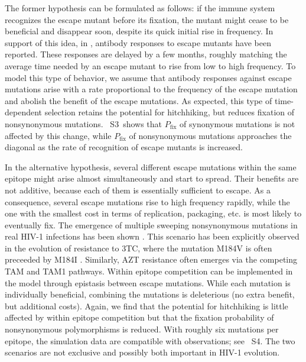 \documentclass[rmp, twocolumn]{revtex4}
\newcommand{\pfix}{P_{\mathrm{fix}}}
\newcommand{\timedependence}{3}
\newcommand{\withinepi}{4}
\begin{document}
The former hypothesis can be formulated as follows: if the immune system
recognizes the escape mutant before its fixation, the mutant might cease to be
beneficial and disappear soon, despite its quick initial rise in frequency. In
support of this idea, in \citet{richman_rapid_2003, bunnik_autologous_2008},
antibody responses to escape mutants have been reported.
These responses are delayed by a few
months, roughly matching the average time needed by an escape mutant to rise
from low to high frequency. To model this type of behavior, we assume that
antibody responses against escape mutations arise with a rate proportional to
the frequency of the escape mutation and abolish the benefit of the escape
mutations. As expected, this type of time-dependent selection retains the
potential for hitchhiking, but reduces fixation of nonsynonymous mutations.
\figurename~S\timedependence~shows that $\pfix$ of synonymous mutations is not
affected by this change, while $\pfix$ of nonsynonymous mutations approaches
the diagonal as the rate of recognition of escape mutants is increased. 

In the alternative hypothesis, several different escape mutations within the
same epitope might arise almost simultaneously and start to spread. Their
benefits are not additive, because each of them is essentially sufficient to
escape. As a consequence, several escape mutations rise to high frequency
rapidly, while the one with the smallest cost in terms of replication,
packaging, etc. is most likely to eventually fix. The emergence of multiple
sweeping nonsynonymous mutations in real HIV-1 infections has been shown
\citep{moore_limited_2009, bar_early_2012}. This scenario has been explicitly 
observed in  the evolution of resistance to 3TC, where the mutation 
M184V is often preceeded by M184I \citep{hedskog_dynamics_2010}. Similarly, AZT 
resistance often emerges via the competing TAM and TAM1 pathways.
Within epitope competition can be
implemented in the model through epistasis between escape mutations. While each
mutation is individually beneficial, combining the mutations is deleterious (no
extra benefit, but additional costs). Again, we find that the potential for
hitchhiking is little affected by within epitope competition but that the
fixation probability of nonsynonymous polymorphisms is reduced. With roughly six
mutations per epitope, the simulation data are compatible with observations; see
\figurename~S\withinepi. The two scenarios are not exclusive and possibly both
important in HIV-1 evolution.
\end{document}
